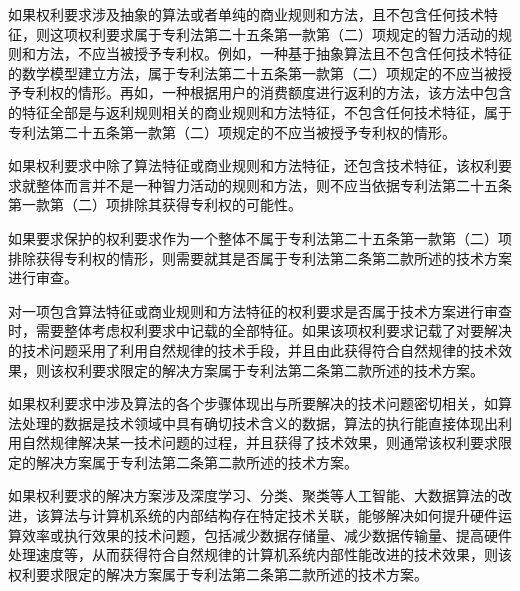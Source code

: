 
{\setlength{\parindent}{20.6bp}如果权利要求涉及抽象的算法或者单纯的商业规则和方法，且不包含任何技术特征，则这项权利要求属于专利法第二十五条第一款第（二）项规定的智力活动的规则和方法，不应当被授予专利权。例如，一种基于抽象算法且不包含任何技术特征的数学模型建立方法，属于专利法第二十五条第一款第（二）项规定的不应当被授予专利权的情形。再如，一种根据用户的消费额度进行返利的方法，该方法中包含的特征全部是与返利规则相关的商业规则和方法特征，不包含任何技术特征，属于专利法第二十五条第一款第（二）项规定的不应当被授予专利权的情形。\par}

{\setlength{\parindent}{20.6bp}如果权利要求中除了算法特征或商业规则和方法特征，还包含技术特征，该权利要求就整体而言并不是一种智力活动的规则和方法，则不应当依据专利法第二十五条第一款第（二）项排除其获得专利权的可能性。\par}

{\setlength{\parindent}{20.6bp}如果要求保护的权利要求作为一个整体不属于专利法第二十五条第一款第（二）项排除获得专利权的情形，则需要就其是否属于专利法第二条第二款所述的技术方案进行审查。\par}

{\setlength{\parindent}{20.6bp}对一项包含算法特征或商业规则和方法特征的权利要求是否属于技术方案进行审查时，需要整体考虑权利要求中记载的全部特征。如果该项权利要求记载了对要解决的技术问题采用了利用自然规律的技术手段，并且由此获得符合自然规律的技术效果，则该权利要求限定的解决方案属于专利法第二条第二款所述的技术方案。\par}

{\setlength{\parindent}{20.6bp}如果权利要求中涉及算法的各个步骤体现出与所要解决的技术问题密切相关，如算法处理的数据是技术领域中具有确切技术含义的数据，算法的执行能直接体现出利用自然规律解决某一技术问题的过程，并且获得了技术效果，则通常该权利要求限定的解决方案属于专利法第二条第二款所述的技术方案。\par}

{\setlength{\parindent}{20.6bp}如果权利要求的解决方案涉及深度学习、分类、聚类等人工智能、大数据算法的改进，该算法与计算机系统的内部结构存在特定技术关联，能够解决如何提升硬件运算效率或执行效果的技术问题，包括减少数据存储量、减少数据传输量、提高硬件处理速度等，从而获得符合自然规律的计算机系统内部性能改进的技术效果，则该权利要求限定的解决方案属于专利法第二条第二款所述的技术方案。\par}

